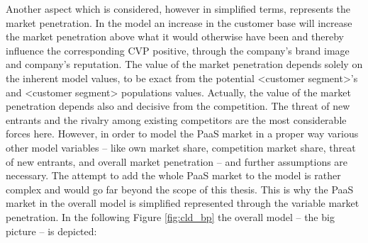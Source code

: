 Another aspect which is considered, however in simplified terms, represents the market penetration. In the model an increase in the customer base will increase the market penetration above what it would otherwise have been and thereby influence the corresponding \ac{CVP} positive, through the company's brand image and company's reputation. The value of the market penetration depends solely on the inherent model values, to be exact from the potential <customer segment>'s and <customer segment> populations values. Actually, the value of the market penetration depends also and decisive from the competition. The threat of new entrants and the rivalry among existing competitors \citep[pp. 80-82, 85-86]{Porter2008} are the most considerable forces here. However, in order to model the \ac{PaaS} market in a proper way various other model variables -- like own market share, competition market share, threat of new entrants, and overall market penetration -- and further assumptions are necessary. The attempt to add the whole \ac{PaaS} market to the model is rather complex and would go far beyond the scope of this thesis. This is why the \ac{PaaS} market in the overall model is simplified represented through the variable market penetration. In the following Figure \ref{fig:cld_bp} the overall model -- the big picture -- is depicted:

\newpage




